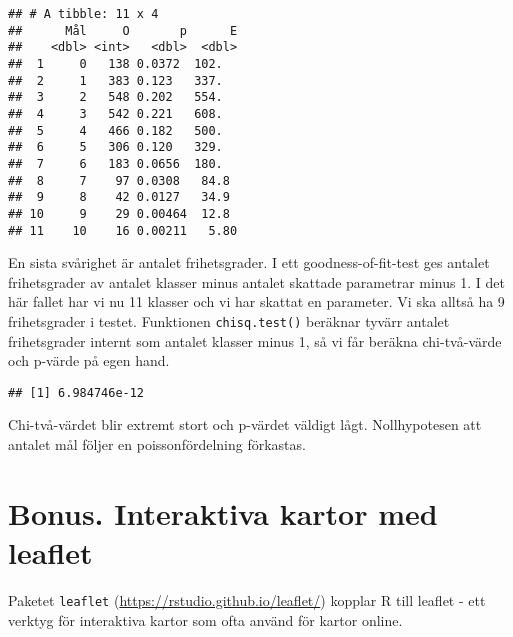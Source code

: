 \documentclass[
]{book}
\newenvironment{Shaded}{\begin{snugshade}}{\end{snugshade}}
\newcommand{\AttributeTok}[1]{\textcolor[rgb]{0.13,0.29,0.53}{#1}}
\newcommand{\DecValTok}[1]{\textcolor[rgb]{0.00,0.00,0.81}{#1}}
\newcommand{\FunctionTok}[1]{\textcolor[rgb]{0.13,0.29,0.53}{\textbf{#1}}}
\newcommand{\NormalTok}[1]{#1}
\newcommand{\OtherTok}[1]{\textcolor[rgb]{0.56,0.35,0.01}{#1}}
\newcommand{\SpecialCharTok}[1]{\textcolor[rgb]{0.81,0.36,0.00}{\textbf{#1}}}
\theoremstyle{definition}
\theoremstyle{definition}
\theoremstyle{definition}
\theoremstyle{definition}
\theoremstyle{remark}
\begin{document}
\begin{verbatim}
## # A tibble: 11 x 4
##      Mål     O       p      E
##    <dbl> <int>   <dbl>  <dbl>
##  1     0   138 0.0372  102.  
##  2     1   383 0.123   337.  
##  3     2   548 0.202   554.  
##  4     3   542 0.221   608.  
##  5     4   466 0.182   500.  
##  6     5   306 0.120   329.  
##  7     6   183 0.0656  180.  
##  8     7    97 0.0308   84.8 
##  9     8    42 0.0127   34.9 
## 10     9    29 0.00464  12.8 
## 11    10    16 0.00211   5.80
\end{verbatim}

En sista svårighet är antalet frihetsgrader. I ett goodness-of-fit-test ges antalet frihetsgrader av antalet klasser minus antalet skattade parametrar minus 1. I det här fallet har vi nu 11 klasser och vi har skattat en parameter. Vi ska alltså ha 9 frihetsgrader i testet. Funktionen \texttt{chisq.test()} beräknar tyvärr antalet frihetsgrader internt som antalet klasser minus 1, så vi får beräkna chi-två-värde och p-värde på egen hand.

\begin{Shaded}
\end{Shaded}

\begin{verbatim}
## [1] 6.984746e-12
\end{verbatim}

Chi-två-värdet blir extremt stort och p-värdet väldigt lågt. Nollhypotesen att antalet mål följer en poissonfördelning förkastas.

\hypertarget{bonus.-interaktiva-kartor-med-leaflet}{%
\section{Bonus. Interaktiva kartor med leaflet}\label{bonus.-interaktiva-kartor-med-leaflet}}

Paketet \texttt{leaflet} (\url{https://rstudio.github.io/leaflet/}) kopplar R till leaflet - ett verktyg för interaktiva kartor som ofta använd för kartor online.
\end{document}
